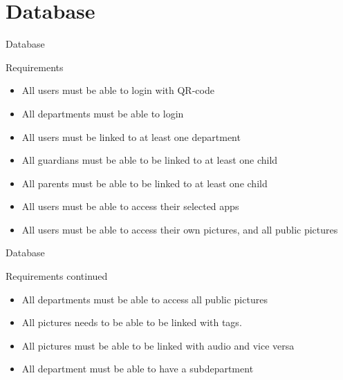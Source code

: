 \section{Database}
\begin{frame}{Database}
\pause
    \begin{block}{Requirements}
        \begin{itemize}
					\pause \item All users must be able to login with QR-code
					\pause \item All departments must be able to login
					\pause \item All users must be linked to at least one department
					\pause \item All guardians must be able to be linked to at least one child
					\pause \item All parents must be able to be linked to at least one child
					\pause \item All users must be able to access their selected apps
					\pause \item All users must be able to access their own pictures, and all public pictures
				\end{itemize}
    \end{block}
\end{frame}
\begin{frame}{Database}
    \begin{block}{Requirements continued}
        \begin{itemize}
					\pause \item All departments must be able to access all public pictures
					\pause \item All pictures needs to be able to be linked with tags.
					\pause \item All pictures must be able to be linked with audio and vice versa
					\pause \item All department must be able to have a subdepartment
				\end{itemize}
    \end{block}
\end{frame}